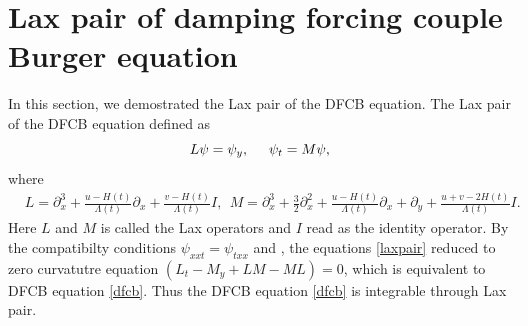 \documentclass{article}%
\begin{document}
\section{Lax pair of damping forcing couple Burger equation}
	In this section, we demostrated the Lax pair of the DFCB equation. The Lax pair of the DFCB equation defined as
\begin{equation}
L\psi=\psi_y,\hspace{5mm}\psi_t=M\psi,\label{laxpair}
\end{equation}
where
\begin{equation}
\begin{split}
&L=\partial_x^3+\frac{u-H(t)}{\Lambda(t)}\partial_x+\frac{v-H(t)}{\Lambda(t)}I,~~ M=\partial_x^3+\frac{3}{2}\partial^2_x+\frac{u-H(t)}{\Lambda(t)}\partial_x+\partial_y+\frac{u+v-2H(t)}{\Lambda(t)}I.
\end{split}
\end{equation}
Here $L$ and $M$ is called the Lax operators and $I$ read as the identity operator. By the compatibilty conditions $\psi_{xxt}=\psi_{txx}$ and , the equations \eqref{laxpair} reduced to zero curvatutre equation $(L_t-M_y+LM-ML)=0$, which is equivalent to DFCB equation \eqref{dfcb}. Thus the DFCB equation \eqref{dfcb} is integrable through Lax pair.
\end{document}
